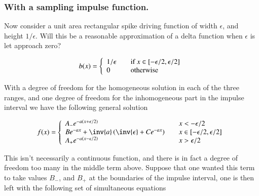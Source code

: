 \subsubsection{With a sampling impulse function. }

Now consider a unit area rectangular spike driving function of width $\epsilon$, and height $1/\epsilon$.  Will this be a reasonable approximation of a delta function when $\epsilon$ is let approach zero?

\begin{align*}
b(x) = 
\left\{
\begin{array}{l l}
1/{\epsilon} & \quad \mbox{if $x \in \left[-\epsilon/2, \epsilon/2 \right]$} \\
0              & \quad \mbox{otherwise}
\end{array} \right.
\end{align*}

With a degree of freedom for the homogeneous solution in each of the three ranges, and one degree of freedom for the inhomogeneous part in the impulse interval we have the following general solution

\begin{align*}
f(x) = 
\left\{
\begin{array}{l l}
A_{-} e^{-a(x + \epsilon/2)} & \quad x < -\epsilon/2 \\
B e^{-ax} + \inv{a}\left(\inv{\epsilon} + C e^{-a x}\right)& \quad x \in \left[-\epsilon/2, \epsilon/2 \right] \\
A_{+} e^{-a(x - \epsilon/2)} & \quad x > \epsilon/2 \\
\end{array} \right.
\end{align*}


This isn't necessarily a continuous function, and there is in fact a degree of freedom too many in the middle term above.  Suppose that one wanted this term
to take values $B_{-}$, and $B_{+}$ at the boundaries of the impulse interval, one is then left with the following set of simultaneous equations

